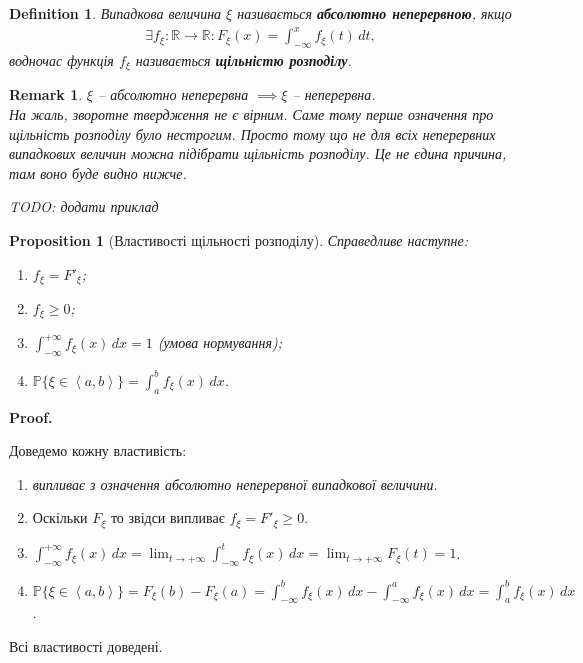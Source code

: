 \documentclass[a4paper, 10pt]{article}
\makeatletter
\theoremstyle{theoremdd}
\newtheorem{definition}[theorem]{Definition}
\newtheorem{proposition}[theorem]{Proposition}
\newtheorem{remark}[theorem]{Remark}
\renewenvironment{proof}[1][Proof.\\]{\par
\pushQED{\hfill \qed}%
\normalfont \topsep6\p@\@plus6\p@\relax
\trivlist
\item\relax
{\bfseries
#1\@addpunct{.}}\hspace\labelsep\ignorespaces
}{%
\popQED\endtrivlist\@endpefalse
}
\makeatother
\begin{document}
\begin{definition}
Випадкова величина $\xi$ називається \textbf{абсолютно неперервною}, якщо
\begin{align*}
\exists f_\xi \colon \mathbb{R} \to \mathbb{R}: F_\xi(x) = \int_{-\infty}^x f_\xi(t)\,dt,
\end{align*}
водночас функція $f_\xi$ називається \textbf{щільністю розподілу}.
\end{definition}

\begin{remark}
$\xi$ -- абсолютно неперервна $\implies \xi$ -- неперервна.\\
На жаль, зворотне твердження не є вірним. Саме тому перше означення про щільність розподілу було нестрогим. Просто тому що не для всіх неперервних випадкових величин можна підібрати щільність розподілу. Це не єдина причина, там воно буде видно нижче.
\begin{figure}[H]
\centering
{}
\end{figure}
\noindent
\textit{TODO: додати приклад}
\end{remark}

\begin{proposition}[Властивості щільності розподілу]
Справедливе наступне:
\begin{enumerate}[nosep,wide=0pt,label={\arabic*)}]
\item $f_\xi = F'_\xi$;
\item $f_{\xi} \geq 0$;
\item $\displaystyle\int_{-\infty}^{+\infty} f_\xi(x)\,dx = 1$ (умова нормування);
\item $\displaystyle\mathbb{P}\{\xi \in \left<a,b\right>\} = \int_a^b f_\xi(x)\,dx$.
\end{enumerate}
\end{proposition}

\begin{proof}
Доведемо кожну властивість:
\begin{enumerate}[wide=0pt,label={\arabic*)}]
\item \textit{випливає з означення абсолютно неперервної випадкової величини}.
\item Оскільки $F_\xi$ то звідси випливає $f_{\xi} = F'_{\xi} \geq 0$.
\item $\displaystyle\int_{-\infty}^{+\infty} f_\xi(x)\,dx = \lim_{t \to +\infty} \int_{-\infty}^t f_\xi(x)\,dx = \lim_{t \to +\infty} F_\xi(t) = 1$.
\item $\displaystyle \mathbb{P}\{\xi \in \left<a,b\right>\} = F_\xi(b) - F_\xi(a) = \int_{-\infty}^b f_\xi(x)\,dx - \int_{-\infty}^a f_\xi(x)\,dx = \int_a^b f_\xi(x)\,dx$.
\end{enumerate}
Всі властивості доведені.
\end{proof}
\end{document}
